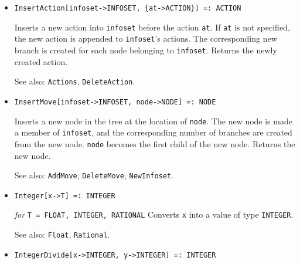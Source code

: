 \begin{itemize}

\item{}
\protect \large \begin{verbatim}
InsertAction[infoset->INFOSET, {at->ACTION}] =: ACTION
\end{verbatim}\normalsize

\bd
Inserts a new action into \verb+infoset+ before the action \verb+at+.  
If \verb+at+ is not specified, the new action is appended to \verb+infoset+'s
actions.
The corresponding new branch is created for
each node belonging to \verb+infoset+.  Returns the newly created action.
\item
[See also:] \verb+Actions+, \verb+DeleteAction+.
\ed

\item{}
\protect \large \begin{verbatim}
InsertMove[infoset->INFOSET, node->NODE] =: NODE
\end{verbatim}\normalsize

\bd
Inserts a new node in the tree at the location of \verb+node+.  The
new node is made a member of \verb+infoset+, and the
corresponding number of branches are created from the new node.  \verb+node+
becomes the first child of the new node.  Returns the new node.
\item [See also:] \verb+AddMove+, \verb+DeleteMove+, \verb+NewInfoset+.
\ed

\item{}
\protect \large \begin{verbatim}
Integer[x->T] =: INTEGER
\end{verbatim} \normalsize

{\it for} {\tt T = FLOAT, INTEGER, RATIONAL}
\bd
Converts \verb+x+ into a value of type \verb+INTEGER+.
\item [See also:] \verb+Float+, \verb+Rational+.
\ed

\item{} 
\protect \large \begin{verbatim}
IntegerDivide[x->INTEGER, y->INTEGER] =: INTEGER
\end{verbatim} \normalsize


\end{itemize}
